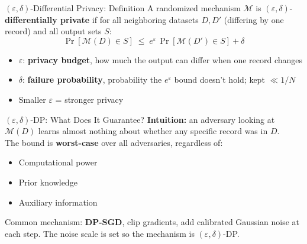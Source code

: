\documentclass[10pt, aspectratio=169]{beamer}
\begin{document}
\begin{frame}{$(\varepsilon,\delta)$-Differential Privacy: Definition}
  A randomized mechanism $\mathcal{M}$ is $(\varepsilon,\delta)$-\textbf{differentially private} if
  for all neighboring datasets $D, D'$ (differing by one record) and all output sets $S$:
  \[
    \Pr[\mathcal{M}(D)\in S] \;\leq\; e^\varepsilon\,\Pr[\mathcal{M}(D')\in S] + \delta
  \]
  \begin{itemize}
    \item $\varepsilon$: \textbf{privacy budget}, how much the output can differ when one record changes
    \item $\delta$: \textbf{failure probability}, probability the $e^\varepsilon$ bound doesn't hold; kept $\ll 1/N$
    \item Smaller $\varepsilon$ = stronger privacy
  \end{itemize}
\end{frame}

\begin{frame}{$(\varepsilon,\delta)$-DP: What Does It Guarantee?}
  \textbf{Intuition:} an adversary looking at $\mathcal{M}(D)$ learns almost nothing about whether
  any specific record was in $D$.\\[10pt]
  The bound is \textbf{worst-case} over all adversaries, regardless of:
  \begin{itemize}
    \item Computational power
    \item Prior knowledge
    \item Auxiliary information
  \end{itemize}
  \vspace{8pt}
  Common mechanism: \textbf{DP-SGD}, clip gradients, add calibrated Gaussian noise at each step.
  The noise scale is set so the mechanism is $(\varepsilon,\delta)$-DP.
\end{frame}
\end{document}
